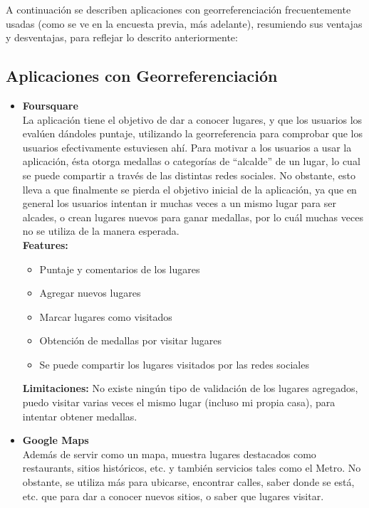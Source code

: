 \documentclass[10pt,letterpaper]{article}
\begin{document}
A continuación se describen aplicaciones con georreferenciación frecuentemente usadas (como se ve en la encuesta previa, más adelante), resumiendo sus ventajas y desventajas, para reflejar lo descrito anteriormente:\\

\subsection{Aplicaciones con Georreferenciación}

\begin{itemize}
 
\item \textbf{Foursquare}\\

La aplicación tiene el objetivo de dar a conocer lugares, y que los usuarios los evalúen dándoles puntaje, utilizando la georreferencia para comprobar que los usuarios efectivamente estuviesen ahí. Para motivar a los usuarios a usar la aplicación, ésta otorga medallas o categorías de “alcalde” de un lugar, lo cual se puede compartir a través de las distintas redes sociales. No obstante, esto lleva a que finalmente se pierda el objetivo inicial de la aplicación, ya que en general los usuarios intentan ir muchas veces a un mismo lugar para ser alcades, o crean lugares nuevos para ganar medallas, por lo cuál muchas veces no se utiliza de la manera esperada.\\

\textbf{Features:}\\
\begin{itemize}
\item Puntaje y comentarios de los lugares
\item Agregar nuevos lugares
\item Marcar lugares como visitados
\item Obtención de medallas por visitar lugares
\item Se puede compartir los lugares visitados por las redes sociales
\end{itemize}

\textbf{Limitaciones:} No existe ningún tipo de validación de los lugares agregados, puedo visitar varias veces el mismo lugar (incluso mi propia casa), para intentar obtener medallas.

\item \textbf{Google Maps}\\

Además de servir como un mapa, muestra lugares destacados como restaurants, sitios históricos, etc. y también servicios tales como el Metro. No obstante, se utiliza más para ubicarse, encontrar calles, saber donde se está, etc. que para dar a conocer nuevos sitios, o saber que lugares visitar.\\


\end{itemize}
\end{document}
